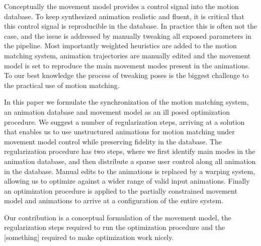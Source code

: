 Conceptually the movement model provides a control signal into the motion database. To keep synthesized animation realistic and fluent, it is critical that this control signal is reproducible in the database. In practice this is often not the case, and the issue is addressed by manually tweaking all exposed parameters in the pipeline. Most importantly weighted heuristics are added to the motion matching system, animation trajectories are manually edited and the movement model is set to reproduce the main movement modes present in the animations. To our best knowledge the process of tweaking poses is the biggest challenge to the practical use of motion matching.

In this paper we formulate the synchronization of the motion matching system, an animation database and movement model as an ill posed optimization procedure. We suggest a number of regularization steps, arriving at a solution that enables us to use unstructured animations for motion matching under movement model control while preserving fidelity in the database. The regularization procedure has two steps, where we first identify main modes in the animation database, and then distribute a sparse user control along all animation in the database. Manual edits to the animations is replaced by a warping system, allowing us to optimize against a wider range of valid input animations. Finally an optimization procedure is applied to the partially constrained movement model and animations to arrive at a configuration of the entire system.

Our contribution is a conceptual formulation of the movement model, the regularization steps required to run the optimization procedure and the [something] required to make optimization work nicely.
